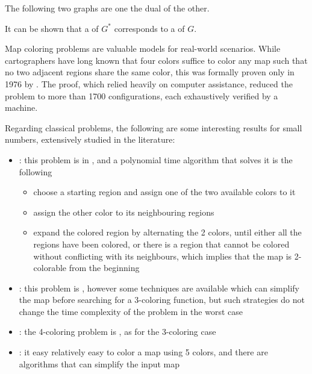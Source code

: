 \documentclass[a4paper, 12pt]{report}
\begin{document}
    \begin{example}
        The following two graphs are one the dual of the other.

    \end{example}

    It can be shown that a  of $G^*$ corresponds to a  of $G$.

    Map coloring problems are valuable models for real-world scenarios. While cartographers have long known that four colors suffice to color any map such that no two adjacent regions share the same color, this was formally proven only in 1976 by \textcite{appel}. The proof, which relied heavily on computer assistance, reduced the problem to more than 1700 configurations, each exhaustively verified by a machine.

    Regarding classical  problems, the following are some interesting results for small numbers, extensively studied in the literature:

    \begin{itemize}
        \item {}: this problem is in \Pclass, and a polynomial time algorithm that solves it is the following
            \begin{itemize}
                \item choose a starting region and assign one of the two available colors to it
                \item assign the other color to its neighbouring regions
                \item expand the colored region by alternating the 2 colors, until either all the regions have been colored, or there is a region that cannot be colored without conflicting with its neighbours, which implies that the map is 2-colorable from the beginning
            \end{itemize}
        \item {}: this problem is \NPHard,  however some techniques are available which can simplify the map before searching for a 3-coloring function, but such strategies do not change the time complexity of the problem in the worst case
        \item {}: the 4-coloring problem is \NPComplete, as for the 3-coloring case
        \item {}: it easy relatively easy to color a map using 5 colors, and there are algorithms that can simplify the input map
    \end{itemize}
\end{document}
